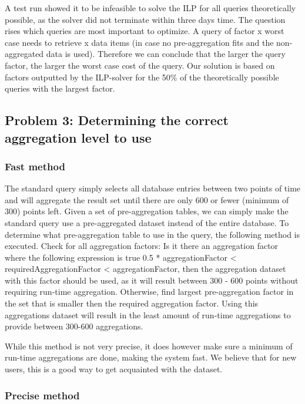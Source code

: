 A test run showed it to be infeasible to solve the ILP for all queries theoretically possible, as the solver did not terminate within three days time. The question rises which queries are most important to optimize. A query of factor x worst case needs to retrieve x data items (in case no pre-aggregation fits and the non-aggregated data is used). Therefore we can conclude that the larger the query factor, the larger the worst case cost of the query. Our solution is based on factors outputted by the ILP-solver for the 50\% of the theoretically possible queries with the largest factor. 

\subsection{Problem 3: Determining the correct aggregation level to use}
\subsubsection{Fast method}
The standard query simply selects all database entries between two points of time and will aggregate the result set until there are only 600 or fewer (minimum of 300) points left. Given a set of pre-aggregation tables, we can simply make the standard query use a pre-aggregated dataset instead of the entire database. To determine what pre-aggregation table to use in the query, the following method is executed. Check for all aggregation factors: Is it there an aggregation factor where the following expression is true 0.5 * aggregationFactor < requiredAggregationFactor < aggregationFactor, then the aggregation dataset with this factor should be used, as it will result between 300 - 600 points without requiring run-time aggregation. Otherwise, find largest pre-aggregation factor in the set that is smaller then the required aggregation factor. Using this aggregations dataset will result in the least amount of run-time aggregations to provide between 300-600 aggregations.


While this method is not very precise, it does however make sure a minimum of run-time aggregations are done, making the system fast. We believe that for new users, this is a good way to get acquainted with the dataset.

\subsubsection{Precise method}

